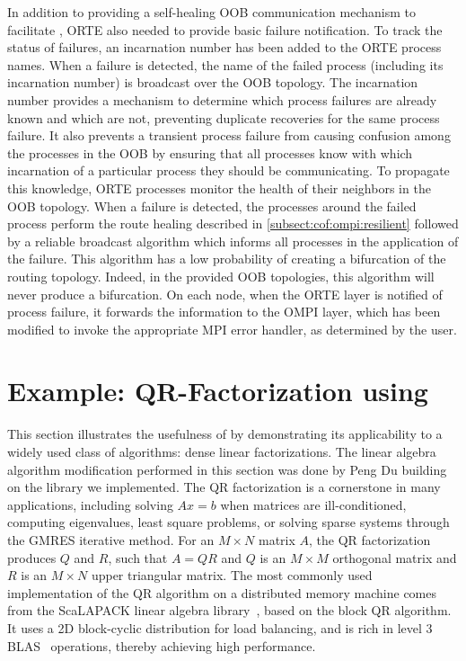In addition to providing a self-healing OOB communication mechanism to
facilitate \cof, ORTE also needed to provide basic failure notification. To
track the status of failures, an incarnation number has been added to the ORTE
process names. When a failure is detected, the name of the failed process
(including its incarnation number) is broadcast over the OOB topology. The
incarnation number provides a mechanism to determine which process failures are
already known and which are not, preventing duplicate recoveries for the same
process failure. It also prevents a transient process failure from causing
confusion among the processes in the OOB by ensuring that all processes know
with which incarnation of a particular process they should be communicating. To
propagate this knowledge, ORTE processes monitor the health of their neighbors
in the OOB topology. When a failure is detected, the processes around the failed
process perform the route healing described in \ref{subsect:cof:ompi:resilient}
followed by a reliable broadcast algorithm which informs all processes in the
application of the failure. This algorithm has a low probability of creating a
bifurcation of the routing topology. Indeed, in the provided OOB topologies, 
this algorithm will never produce a bifurcation. On each node, when the ORTE 
layer is notified of process failure, it forwards the information to the OMPI 
layer, which has been modified to invoke the appropriate MPI error handler, as 
determined by the user.

\section{Example: QR-Factorization using \cof}\label{sect:cof:cofqr}

This section illustrates the usefulness of \cof by demonstrating its applicability to a
widely used class of algorithms: dense linear factorizations. The linear algebra
algorithm modification performed in this section was done by Peng Du building on the \cof library we
implemented. The QR factorization is a cornerstone in many applications,
including solving $Ax = b$ when matrices are ill-conditioned, computing
eigenvalues, least square problems, or solving sparse systems through the GMRES
iterative method. For an $M \times N$ matrix $A$, the QR factorization produces
$Q$ and $R$, such that $A = QR$ and $Q$ is an $M \times M$ orthogonal matrix and
$R$ is an $M \times N$ upper triangular matrix. The most commonly used
implementation of the QR algorithm on a distributed memory machine comes from
the ScaLAPACK linear algebra library~\cite{dongarra1997scalapack}, based on the
block QR algorithm. It uses a 2D block-cyclic distribution for load balancing,
and is rich in level 3 BLAS~\cite{Dongarra:1990wl} operations, thereby achieving
high performance.

